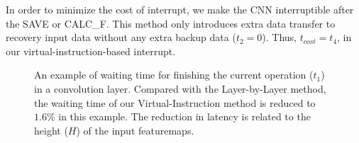 In order to minimize the cost of interrupt, we make the CNN interruptible after the SAVE or CALC\_F. This method only introduces extra data transfer to recovery input data without any extra backup data ($t_2 = 0$). Thus, $t_{cost} = t_4$, in our virtual-instruction-based interrupt.



\begin{figure}[t]
	\centering
	\vspace{-1mm} 
	\caption{ An example of waiting time for finishing the current operation ($t_1$) in a convolution layer. Compared with the Layer-by-Layer method, the waiting time of our Virtual-Instruction method is reduced to $1.6\%$ in this example. The reduction in latency is related to the height ($H$) of the input featuremaps. }
	\label{fig:t1example}
\end{figure}



